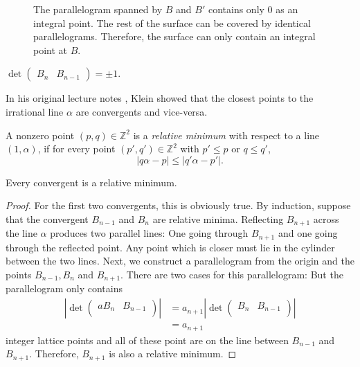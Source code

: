 \begin{figure}[tb]
  \centering
  
  \caption{
    The parallelogram spanned by $B$ and $B'$ contains only $0$ as an integral point.
    The rest of the surface can be covered by identical parallelograms.
    Therefore, the surface can only contain an integral point at $B$.
  }
\end{figure}

\begin{lemma}
  $\det\begin{pmatrix} B_n & B_{n-1} \end{pmatrix} = ±1$.
\end{lemma}

In his original lecture notes \cite{Klein95},
Klein showed that the closest points to the irrational line $α$ are convergents and
vice-versa.

\begin{definition}
  A nonzero point $(p, q) ∈ ℤ^2$ is a \emph{relative minimum} with respect to a
  line $(1, α)$, if for every point $(p', q') ∈ ℤ^2$ with $p' ≤ p$ or $q ≤ q'$,
  \[
    |q α - p| ≤ |q' α - p'|.
  \]
\end{definition}

\begin{theorem}
  \label{thm:conv-is-relmin}
  Every convergent is a relative minimum.
\end{theorem}

\begin{proof}
  For the first two convergents, this is obviously true.
  By induction, suppose that the convergent $B_{n-1}$ and $B_n$ are relative minima.
  Reflecting $B_{n+1}$ across the line $α$ produces two parallel lines:
  One going through $B_{n+1}$ and one going through the reflected point.
  Any point which is closer must lie in the cylinder between the two lines.
  Next, we construct a parallelogram from the origin and the points $B_{n-1}, B_n$ and $B_{n+1}$.
  There are two cases for this parallelogram:
  But the parallelogram only contains
  \begin{align*}
    |\det \begin{pmatrix}
      a B_n & B_{n-1} \\
    \end{pmatrix}|
    & = a_{n+1} |\det \begin{pmatrix}
      B_n & B_{n-1} \\
    \end{pmatrix}| \\
    & = a_{n+1}
  \end{align*}
  integer lattice points and all of these point are on the line between $B_{n-1}$ and $B_{n+1}$.
  Therefore, $B_{n+1}$ is also a relative minimum.
\end{proof}

